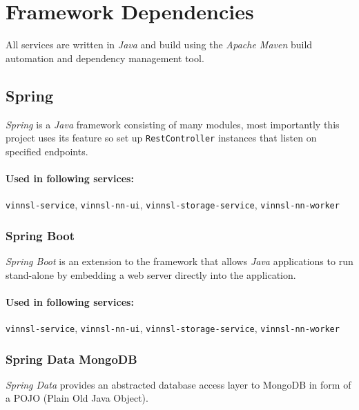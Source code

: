 \section{Framework Dependencies}\label{framework-dependencies}

All services are written in \emph{Java} and build using the \emph{Apache
Maven} build automation and dependency management tool.

\subsection{Spring}\label{spring}

\emph{Spring} is a \emph{Java} framework consisting of many modules,
most importantly this project uses its feature so set up
\texttt{RestController} instances that listen on specified endpoints.

\paragraph{Used in following
services:}\label{used-in-following-services}

\texttt{vinnsl-service}, \texttt{vinnsl-nn-ui},
\texttt{vinnsl-storage-service}, \texttt{vinnsl-nn-worker}

\subsubsection{Spring Boot}\label{spring-boot}

\emph{Spring Boot} is an extension to the framework that allows
\emph{Java} applications to run stand-alone by embedding a web server
directly into the application. \cite{spring-boot}

\paragraph{Used in following
services:}\label{used-in-following-services-1}

\texttt{vinnsl-service}, \texttt{vinnsl-nn-ui},
\texttt{vinnsl-storage-service}, \texttt{vinnsl-nn-worker}

\subsubsection{Spring Data MongoDB}\label{spring-data-mongodb}

\emph{Spring Data} provides an abstracted database access layer to
MongoDB in form of a POJO (Plain Old Java Object). \cite{spring-data}

